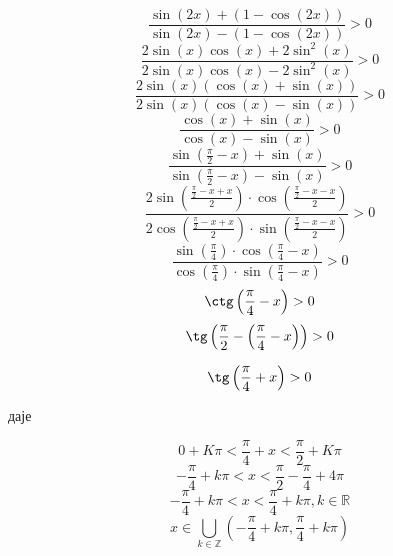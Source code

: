 \documentclass[../diplomski.tex]{subfiles}
\begin{document}
\[\frac{\sin(2x)+(1-\cos(2x))}{\sin(2x)-(1-\cos(2x))}>0\]
\[\frac{2\sin(x)\cos(x)+2\sin^{2}(x)}{2\sin(x)\cos(x)-2\sin^{2}(x)}>0\]
\[\frac{2\sin(x)(\cos(x)+\sin(x))}{2\sin(x)(\cos(x)-\sin(x))}>0\]
\[\frac{\cos(x)+\sin(x)}{\cos(x)-\sin(x)}>0\]
\[\frac{\sin\left(\frac{\pi}{2}-x\right)+\sin(x)}{\sin\left(\frac{\pi}{2}-x\right)-\sin(x)}>0\]
\[\frac{2\sin\left(\frac{\frac{\pi}{2}-x+x}{2}\right)\cdot\cos\left(\frac{\frac{\pi}{2}-x-x}{2}\right)}{2\cos\left(\frac{\frac{\pi}{2}-x+x}{2}\right)\cdot\sin\left(\frac{\frac{\pi}{2}-x-x}{2}\right)}>0\]
\[\frac{\sin\left(\frac{\pi}{4}\right)\cdot\cos\left(\frac{\pi}{4}-x\right)}{\cos\left(\frac{\pi}{4}\right)\cdot\sin\left(\frac{\pi}{4}-x\right)}>0\]
\[\ctg\left(\frac{\pi}{4}-x\right)>0\]
\[\tg\left(\frac{\pi}{2}-\left(\frac{\pi}{4}-x\right)\right)>0\]



\[\tg\left(\frac{\pi}{4}+x\right)>0\]
\centerline{даје}
\[0+K\pi<\frac{\pi}{4}+x<\frac{\pi}{2}+K\pi\]
\[-\frac{\pi}{4}+k\pi<x<\frac{\pi}{2}-\frac{\pi}{4}+4\pi\]
\[-\frac{\pi}{4}+k\pi<x<\frac{\pi}{4}+k\pi,k\in\mathbb{R}\]
\[x\in\bigcup_{k\in\mathbb{Z}}\left(-\frac{\pi}{4}+k\pi,\frac{\pi}{4}+k\pi\right)\]
\end{document}

